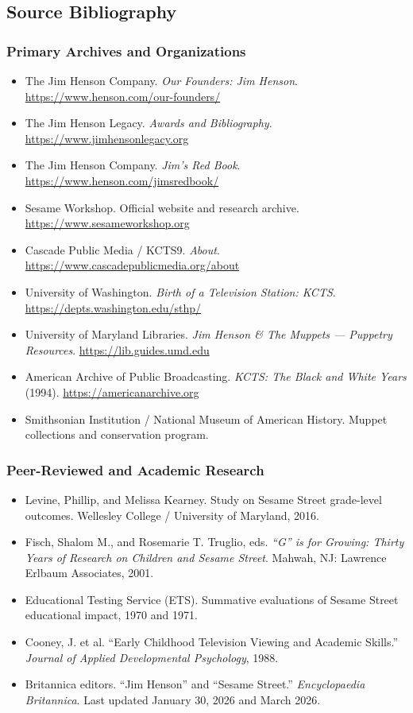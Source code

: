 \documentclass[11pt,letterpaper]{article}
\begin{document}
\subsection{Source Bibliography}

\subsubsection{Primary Archives and Organizations}
\begin{itemize}[leftmargin=*]
  \item The Jim Henson Company. \textit{Our Founders: Jim Henson}. \url{https://www.henson.com/our-founders/}
  \item The Jim Henson Legacy. \textit{Awards and Bibliography}. \url{https://www.jimhensonlegacy.org}
  \item The Jim Henson Company. \textit{Jim's Red Book}. \url{https://www.henson.com/jimsredbook/}
  \item Sesame Workshop. Official website and research archive. \url{https://www.sesameworkshop.org}
  \item Cascade Public Media / KCTS9. \textit{About}. \url{https://www.cascadepublicmedia.org/about}
  \item University of Washington. \textit{Birth of a Television Station: KCTS}. \url{https://depts.washington.edu/sthp/}
  \item University of Maryland Libraries. \textit{Jim Henson \& The Muppets --- Puppetry Resources}. \url{https://lib.guides.umd.edu}
  \item American Archive of Public Broadcasting. \textit{KCTS: The Black and White Years} (1994). \url{https://americanarchive.org}
  \item Smithsonian Institution / National Museum of American History. Muppet collections and conservation program.
\end{itemize}

\subsubsection{Peer-Reviewed and Academic Research}
\begin{itemize}[leftmargin=*]
  \item Levine, Phillip, and Melissa Kearney. Study on Sesame Street grade-level outcomes. Wellesley College / University of Maryland, 2016.
  \item Fisch, Shalom M., and Rosemarie T. Truglio, eds. \textit{``G'' is for Growing: Thirty Years of Research on Children and Sesame Street}. Mahwah, NJ: Lawrence Erlbaum Associates, 2001.
  \item Educational Testing Service (ETS). Summative evaluations of Sesame Street educational impact, 1970 and 1971.
  \item Cooney, J. et al. ``Early Childhood Television Viewing and Academic Skills.'' \textit{Journal of Applied Developmental Psychology}, 1988.
  \item Britannica editors. ``Jim Henson'' and ``Sesame Street.'' \textit{Encyclopaedia Britannica}. Last updated January 30, 2026 and March 2026.
\end{itemize}
\end{document}
